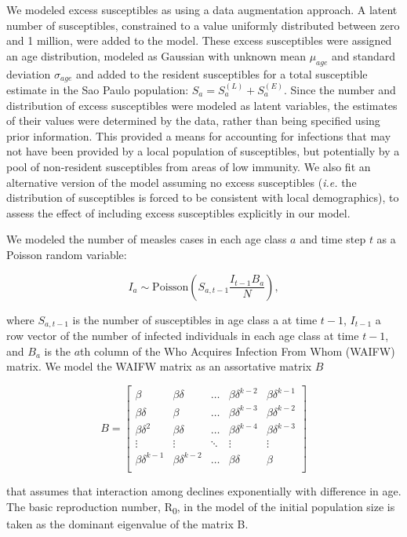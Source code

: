 We modeled excess susceptibles as using a data augmentation approach. A latent number of susceptibles, constrained to a value uniformly distributed between zero and 1 million, were added to the model. These excess susceptibles were assigned an age distribution, modeled as Gaussian with unknown mean \(\mu_{age}\) and standard deviation \(\sigma_{age}\) and added to the resident susceptibles for a total susceptible estimate in the Sao Paulo population: \(S_a = S_a^{(L)} + S_a^{(E)}\). Since the number and distribution of excess susceptibles were modeled as latent variables, the estimates of their values were determined by the data, rather than being specified using prior information. This provided a means for accounting for infections that may not have been provided by a local population of susceptibles, but potentially by a pool of non-resident susceptibles from areas of low immunity. We also fit an alternative version of the model assuming no excess susceptibles (\emph{i.e.} the distribution of susceptibles is forced to be consistent with local demographics), to assess the effect of including excess susceptibles explicitly in our model.

We modeled the number of measles cases in each age class \(a\) and time step \(t\) as a Poisson random variable:

\[I_a \sim \text{Poisson}\left(S_{a,t-1} \frac{I_{t-1}B_a}{N} \right),\] 

where \(S_{a,t-1}\) is the number of susceptibles in age class a at time \(t-1\), \(I_{t-1}\) a row vector of the number of infected individuals in each age class at time \(t-1\), and \(B_a\) is the \(a\)th column of the Who Acquires Infection From Whom (WAIFW) matrix.  We model the WAIFW matrix as an assortative matrix \(B\)

\[B = \left[{
\begin{array}{c}
  {\beta} & {\beta \delta} & \ldots & {\beta \delta^{k-2}} & {\beta \delta^{k-1}}  \\
  {\beta \delta} & {\beta} & \ldots & {\beta \delta^{k-3}} & {\beta \delta^{k-2}} \\
{\beta \delta^2} & {\beta \delta} & \ldots & {\beta \delta^{k-4}} & {\beta \delta^{k-3}}  \\
  \vdots & \vdots & \ddots & \vdots & \vdots \\
  {\beta \delta^{k-1}} & {\beta \delta^{k-2}} & \ldots & {\beta \delta} & {\beta}  \\
\end{array}
}\right]\]

that assumes that interaction among declines exponentially with
difference in age. The basic reproduction number, R\textsubscript{0}, in
the model of the initial population size is taken as the dominant
eigenvalue of the matrix B.